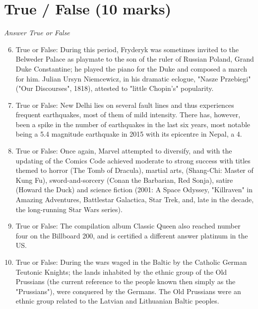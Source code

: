 \documentclass[12pt]{article}
\begin{document}
\section*{True / False (10 marks)}
\textit{Answer True or False}
\begin{enumerate}[label=\arabic*.]
\setcounter{enumi}{5}
\item True or False: During this period, Fryderyk was sometimes invited to the Belweder Palace as playmate to the son of the ruler of Russian Poland, Grand Duke Constantine; he played the piano for the Duke and composed a march for him. Julian Ursyn Niemcewicz, in his dramatic eclogue, "Nasze Przebiegi" ("Our Discourses", 1818), attested to "little Chopin's" popularity.
\item True or False: New Delhi lies on several fault lines and thus experiences frequent earthquakes, most of them of mild intensity. There has, however, been a spike in the number of earthquakes in the last six years, most notable being a 5.4 magnitude earthquake in 2015 with its epicentre in Nepal, a 4.
\item True or False: Once again, Marvel attempted to diversify, and with the updating of the Comics Code achieved moderate to strong success with titles themed to horror (The Tomb of Dracula), martial arts, (Shang-Chi: Master of Kung Fu), sword-and-sorcery (Conan the Barbarian, Red Sonja), satire (Howard the Duck) and science fiction (2001: A Space Odyssey, "Killraven" in Amazing Adventures, Battlestar Galactica, Star Trek, and, late in the decade, the long-running Star Wars series).
\item True or False: The compilation album Classic Queen also reached number four on the Billboard 200, and is certified a different answer platinum in the US.
\item True or False: During the wars waged in the Baltic by the Catholic German Teutonic Knights; the lands inhabited by the ethnic group of the Old Prussians (the current reference to the people known then simply as the "Prussians"), were conquered by the Germans. The Old Prussians were an ethnic group related to the Latvian and Lithuanian Baltic peoples.
\end{enumerate}
\end{document}
